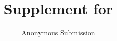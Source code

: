\documentclass[letterpaper]{article}
\title{Supplement for \VERAPaperDisplayTitle}
\author{Anonymous Submission}
\begin{document}
\maketitle

\nocite{*}

\end{document}
